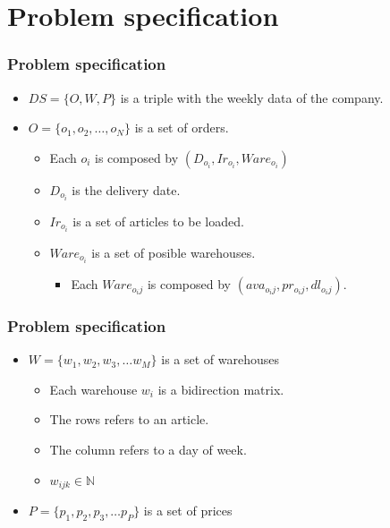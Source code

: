 \documentclass[t,compress,11pt,xcolor=dvipsnames,pdf,english]{beamer}
\begin{document}
\section{Problem specification}

\begin{frame}[c]{ }
    \frametitle{Problem specification}
    
    \vspace{\baselineskip}
    \begin{itemize}
        \item $DS = \{O, W, P\}$ is a triple with the weekly data of the company.
        \item $O = \{o_1, o_2, \dots, o_N \}$ is a set of orders.
        \begin{itemize}
            \item Each $o_i$ is composed by $(D_{o_i},Ir_{o_i},Ware_{o_i})$
            \item $D_{o_i}$ is the delivery date.
            \item $Ir_{o_i}$ is a set of articles to be loaded.
            \item $Ware_{o_i}$ is a set of posible warehouses.
            \begin{itemize}
                \item Each $Ware_{{o_i}j}$ is composed by $(ava_{o_{i}j},pr_{o_{i}j}, dl_{o_{i}j})$.
            \end{itemize}
        \end{itemize}

    \end{itemize}
    
\end{frame}

\begin{frame}[c]{ }
\frametitle{Problem specification}

\vspace{\baselineskip}
\begin{itemize}
    \item $W = \{w_1, w_2, w_3, \dots w_M \}$ is a set of warehouses
    \begin{itemize}
        \item Each warehouse $w_i$ is a bidirection matrix.
        \item The rows refers to an article.
        \item The column refers to a day of week.
        \item $w_{ijk} \in \mathbb{N}$
    \end{itemize}
    \item $P = \{p_1, p_2, p_3, \dots p_P \}$ is a set of prices

\end{itemize}

\end{frame}
\end{document}
